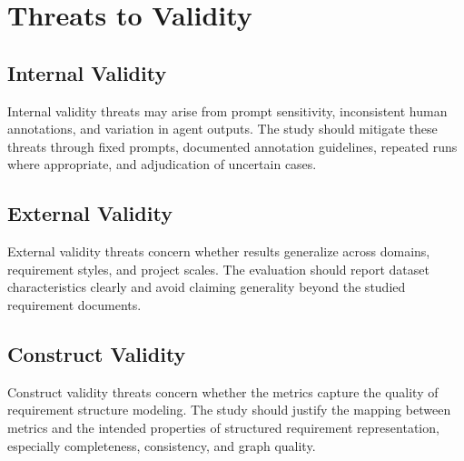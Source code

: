 \section{Threats to Validity}
\label{threats}

\subsection{Internal Validity}
\label{sec:threats-internal}

Internal validity threats may arise from prompt sensitivity, inconsistent human annotations, and variation in agent outputs.
The study should mitigate these threats through fixed prompts, documented annotation guidelines, repeated runs where appropriate, and adjudication of uncertain cases.

\subsection{External Validity}
\label{sec:threats-external}

External validity threats concern whether results generalize across domains, requirement styles, and project scales.
The evaluation should report dataset characteristics clearly and avoid claiming generality beyond the studied requirement documents.

\subsection{Construct Validity}
\label{sec:threats-construct}

Construct validity threats concern whether the metrics capture the quality of requirement structure modeling.
The study should justify the mapping between metrics and the intended properties of structured requirement representation, especially completeness, consistency, and graph quality.
